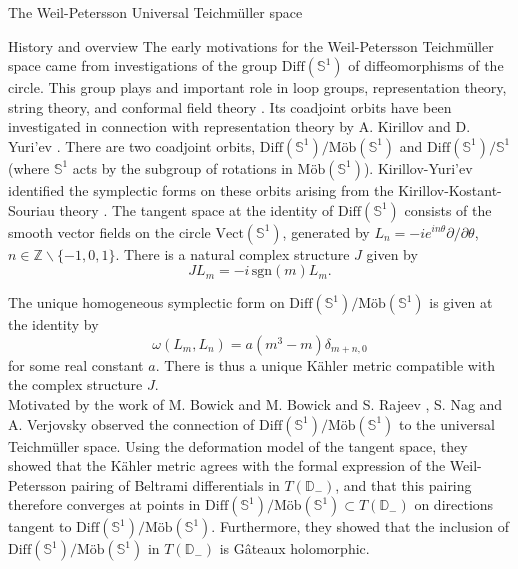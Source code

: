 \documentclass[12pt]{amsart}
\newcommand{\disk}{\ensuremath{\mathbb{D}} } %
\theoremstyle{plain}
\theoremstyle{definition}
\theoremstyle{remark}
\numberwithin{equation}{section} %
\numberwithin{figure}{section} %
\begin{document}
\begin{section}{The Weil-Petersson Universal Teichm\"uller space}
\label{se:WP_Universal_Teich}
\begin{subsection}{History and overview} \label{se:WPUniversal_history}
  The early motivations for the Weil-Petersson Teichm\"uller space came from investigations of the group $\mathrm{Diff}(\mathbb{S}^1)$ of diffeomorphisms of the circle. This group plays and important role in loop groups, representation theory, string theory, and conformal field theory \cite{Khesin_Wendt, Pressley_Segal,BowickRajeev, BowickRajeev_short, Pekonen, Schottenloher, Witten}. Its coadjoint orbits have been investigated in connection with representation theory by A. Kirillov and D. Yuri'ev \cite{KY2,Kirillov_short}. There are two coadjoint orbits, $\mathrm{Diff}(\mathbb{S}^1)/\text{M\"ob}(\mathbb{S}^1)$ and $\mathrm{Diff}(\mathbb{S}^1)/\mathbb{S}^1$ (where $\mathbb{S}^1$ acts by the subgroup of rotations in $\text{M\"ob}(\mathbb{S}^1)$). Kirillov-Yuri'ev identified the symplectic forms on these orbits arising from the Kirillov-Kostant-Souriau theory \cite{Kirillov_short,KY2}.  The tangent space at the identity of $\mathrm{Diff}(\mathbb{S}^1)$ consists of the smooth vector fields on the circle $\mathrm{Vect}(\mathbb{S}^1)$, generated by $L_n =-i e^{in \theta} \partial/\partial \theta$, $n \in \mathbb{Z} \backslash \{-1,0,1\}$. There is a natural complex structure $J$ given by 
  \[  J L_m =  -i \, \mathrm{sgn}(m) L_m.    \]
  
  The unique homogeneous symplectic form on $\mathrm{Diff}(\mathbb{S}^1)/\text{M\"ob}(\mathbb{S}^1)$ is given at the identity by \cite{KY2,Kirillov_short,Bowick_Lahiri} 
  \[  \omega(L_m,L_n) = a (m^3-m) \delta_{m+n,0}   \]
  for some real constant $a$. 
  There is thus a unique K\"ahler metric compatible with the complex structure $J$.\\ 

  Motivated by the work of M. Bowick \cite{Bowick} and M. Bowick and S. Rajeev \cite{BowickRajeev},
  S. Nag and A. Verjovsky \cite{NagVerjovsky} observed the connection of $\mathrm{Diff}(\mathbb{S}^1)/\text{M\"ob}(\mathbb{S}^1)$ to the universal Teichm\"uller space. Using the deformation model of the tangent space, they showed that the K\"ahler metric agrees with the formal expression of the Weil-Petersson pairing of Beltrami differentials in $T(\disk_-)$, and that this pairing therefore converges at points in $\mathrm{Diff}(\mathbb{S}^1)/\text{M\"ob}(\mathbb{S}^1) \subset T(\disk_-)$ on directions tangent to $\mathrm{Diff}(\mathbb{S}^1)/\text{M\"ob}(\mathbb{S}^1)$.  Furthermore, they showed that the inclusion of $\mathrm{Diff}(\mathbb{S}^1)/\text{M\"ob}(\mathbb{S}^1)$ in $T(\disk_-)$ is G\^{a}teaux holomorphic. 


\end{subsection}
\end{section}
\end{document}
